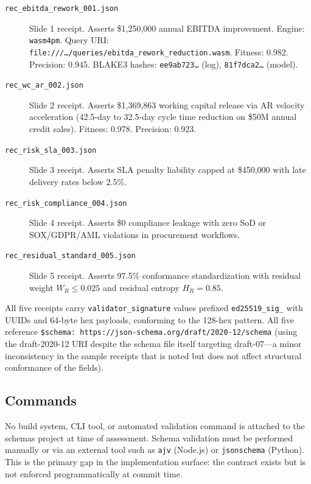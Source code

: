 \begin{description}
  \item[\texttt{rec\_ebitda\_rework\_001.json}] Slide 1 receipt. Asserts \$1,250,000 annual EBITDA
    improvement. Engine: \texttt{wasm4pm}. Query URI:
    \texttt{file:///\ldots/queries/ebitda\_rework\_reduction.wasm}. Fitness: 0.982. Precision: 0.945.
    BLAKE3 hashes: \texttt{ee9ab723\ldots} (log), \texttt{81f7dca2\ldots} (model).
  \item[\texttt{rec\_wc\_ar\_002.json}] Slide 2 receipt. Asserts \$1,369,863 working capital
    release via AR velocity acceleration (42.5-day to 32.5-day cycle time reduction on
    \$50M annual credit sales). Fitness: 0.978. Precision: 0.923.
  \item[\texttt{rec\_risk\_sla\_003.json}] Slide 3 receipt. Asserts SLA penalty liability capped
    at \$450,000 with late delivery rates below 2.5\%.
  \item[\texttt{rec\_risk\_compliance\_004.json}] Slide 4 receipt. Asserts \$0 compliance leakage
    with zero SoD or SOX/GDPR/AML violations in procurement workflows.
  \item[\texttt{rec\_residual\_standard\_005.json}] Slide 5 receipt. Asserts 97.5\% conformance
    standardization with residual weight $W_R \le 0.025$ and residual entropy $H_R = 0.85$.
\end{description}

All five receipts carry \texttt{validator\_signature} values prefixed \texttt{ed25519\_sig\_} with
UUIDs and 64-byte hex payloads, conforming to the 128-hex pattern. All five reference
\texttt{\$schema: https://json-schema.org/draft/2020-12/schema} (using the draft-2020-12 URI
despite the schema file itself targeting draft-07---a minor inconsistency in the sample receipts
that is noted but does not affect structural conformance of the fields).

\subsection{Commands}
\label{sec:schemas-implementation-commands}

No build system, CLI tool, or automated validation command is attached to the schemas project at
time of assessment. Schema validation must be performed manually or via an external tool such as
\texttt{ajv} (Node.js) or \texttt{jsonschema} (Python). This is the primary gap in the
implementation surface: the contract exists but is not enforced programmatically at commit time.

